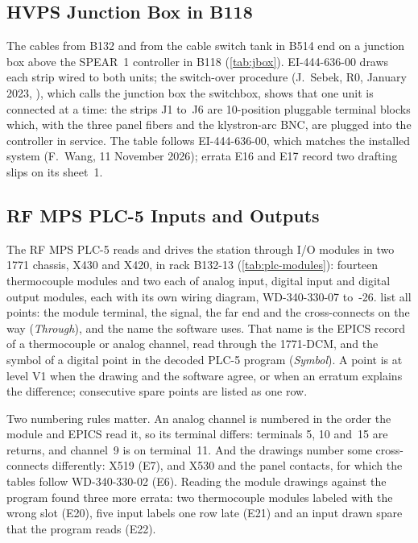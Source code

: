 

\subsection{HVPS Junction Box in B118}\label{sec:jbox}

The cables from B132 and from the cable switch tank in B514 end on a junction box
above the SPEAR~1 controller in B118 (\cref{tab:jbox}). EI-444-636-00 draws each
strip wired to both units; the switch-over procedure (J.~Sebek, R0, January 2023,
), which calls
the junction box the switchbox, shows that one unit is connected at a time: the
strips J1 to~J6 are 10-position pluggable terminal blocks which, with the three panel
fibers and the klystron-arc BNC, are plugged into the controller in service. The table follows EI-444-636-00, which matches
the installed system (F.~Wang, 11 November 2026); errata E16 and E17 record two
drafting slips on its sheet~1.



\subsection{RF MPS PLC-5 Inputs and Outputs}\label{sec:plcio}

The RF MPS PLC-5 reads and drives the station through \WPLCModules{} I/O modules in two
1771 chassis, X430 and X420, in rack B132-13 (\cref{tab:plc-modules}): fourteen
thermocouple modules and two each of analog input, digital input and digital output
modules, each with its own wiring diagram, WD-340-330-07 to~-26.
 list all \WPLCPoints{}
points: the module terminal, the signal, the far end and the cross-connects on the way
(\emph{Through}), and the name the software uses. That name is the EPICS record of a
thermocouple or analog channel, read through the 1771-DCM, and the symbol of a digital
point in the decoded PLC-5 program (\emph{Symbol}). A point is at level V1 when the drawing and the
software agree, or when an erratum explains the difference; consecutive spare points
are listed as one row.

Two numbering rules matter. An analog channel is numbered in the order the module and
EPICS read it, so its terminal differs: terminals 5, 10 and~15 are returns, and
channel~9 is on terminal~11. And the drawings number some cross-connects differently:
X519 (E7), and X530 and the panel contacts, for which the tables follow WD-340-330-02
(E6). Reading the module drawings against the program found three more errata: two
thermocouple modules labeled with the wrong slot (E20), five input labels one row late
(E21) and an input drawn spare that the program reads (E22).

